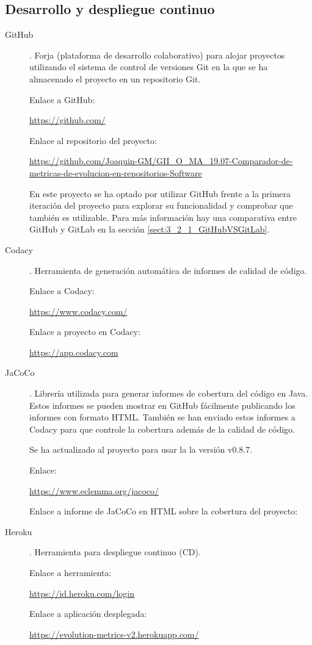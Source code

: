 \subsection{Desarrollo y despliegue continuo}
\begin{description}
	\item[GitHub]. Forja (plataforma de desarrollo colaborativo) para alojar proyectos utilizando el sistema de control de versiones Git en la que se ha almacenado el proyecto en un repositorio Git.
	
		Enlace a GitHub:
		
		\url{https://github.com/}
		
		Enlace al repositorio del proyecto:
		
		\url{https://github.com/Joaquin-GM/GII_O_MA_19.07-Comparador-de-metricas-de-evolucion-en-repositorios-Software}
		
		En este proyecto se ha optado por utilizar GitHub frente a la primera iteración del proyecto \cite{TFGPrevio} para explorar su funcionalidad y comprobar que también es utilizable. Para más información hay una comparativa entre GitHub y GitLab en la sección \ref{sect:3_2_1_GitHubVSGitLab}.
		
	\item[Codacy]. Herramienta de generación automática de informes de calidad de código.
	
		 Enlace a Codacy:
		 
		 \url{https://www.codacy.com/}
		 
		 Enlace a proyecto en Codacy: 
		 
		 \url{https://app.codacy.com}
	
	\item[JaCoCo]. Librería utilizada para generar informes de cobertura del código en Java. Estos informes se pueden mostrar en GitHub fácilmente publicando los informes con formato HTML. También se han enviado estos informes a Codacy para que controle la cobertura además de la calidad de código.
	
		Se ha actualizado al proyecto para usar la la versión v0.8.7. 
		
		Enlace:
		
		\url{https://www.eclemma.org/jacoco/}
		
		Enlace a informe de JaCoCo en HTML sobre la cobertura del proyecto:
		
	
	\item[Heroku]. Herramienta para despliegue continuo (CD).
	
		Enlace a herramienta:
		
		\url{https://id.heroku.com/login}
		
		Enlace a aplicación desplegada:
		
		\url{https://evolution-metrics-v2.herokuapp.com/}
	
\end{description}
